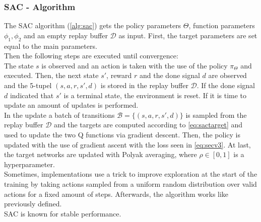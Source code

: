 \subsubsection{SAC - Algorithm}
The SAC algorithm (\cref{alg:sac}) gets the policy parameters $\Theta$, 
function parameters $\phi_1, \phi_2$ and an empty replay buffer $\mathcal{D}$ as input. 
First, the target parameters are set equal to the main parameters.\\
Then the following steps are executed until convergence:\\
The state $s$ is observed and an action is taken with the use of the policy $\pi_{\Theta}$ and executed.
Then, the next state $s'$, reward $r$ and the done signal $d$ are observed and the 5-tupel $(s, a, r, s', d)$ 
is stored in the replay buffer $\mathcal{D}$. If the done signal $d$ indicated that $s'$ is a terminal state, the environment is reset.
If it is time to update an amount of updates is performed.\\
In the update a batch of transitions $\mathcal{B}= \{(s,a,r,s', d)\}$ is sampled from the replay buffer $\mathcal{D}$ 
and the targets are computed according to \cref{eq:sactarget} and used to update the two Q functions via gradient descent. 
Then, the policy is updated with the use of gradient ascent with the loss seen in \cref{eq:secv3}.
At last, the target networks are updated with Polyak averaging, where $\rho \in [0,1]$ is a hyperparameter.\\
\newline
Sometimes, implementations use a trick to improve exploration at the start of the training by taking actions sampled from a uniform random distribution 
over valid actions for a fixed amount of steps. Afterwards, the algorithm works like previously defined.\\
SAC is known for stable performance.

